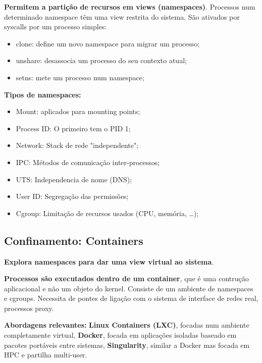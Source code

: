 \documentclass{article}
\begin{document}
\begin{flushleft}
  \textbf{Permitem a partição de recursos em views (namespaces)}.
  Processos num determinado namespace têm uma view restrita do sistema.
  São ativados por syscalls por um processo simples:
  \begin{itemize}
    \item clone: define um novo namespace para migrar um processo;
    \item unshare: desassocia um processo do seu contexto atual;
    \item setns: mete um processo num namespace;
  \end{itemize}

  \vspace{2mm}

  \textbf{Tipos de namespaces:}
  \begin{itemize}
    \item Mount: aplicados para mounting points;
    \item Process ID: O primeiro tem o PID 1;
    \item Network: Stack de rede "independente";
    \item IPC: Métodos de comunicação inter-processos;
    \item UTS: Independencia de nome (DNS);
    \item User ID: Segregação das permissões;
    \item Cgroup: Limitação de recursos usados (CPU, memória, \dots); 
  \end{itemize}
\end{flushleft}

\subsection{Confinamento: Containers}

\begin{flushleft}
  \textbf{Explora namespaces para dar uma view virtual ao sistema}.

  \vspace{2mm}

  \textbf{Processos são executados dentro de um container}, que é uma contrução
  aplicacional e não um objeto do kernel. Consiste de um ambiente
  de namespaces e cgroups. Necessita de pontes de ligação com o sistema de interface
  de redes real, processos proxy.

  \vspace{2mm}

  \textbf{Abordagens relevantes:} \textbf{Linux Containers (LXC)}, focadas num ambiente completamente
  virtual, \textbf{Docker}, focada em aplicações isoladas baseado em pacotes portáveis
  entre sistemas, \textbf{Singularity}, similar a Docker mas focada em HPC e partilha
  multi-user.
\end{flushleft}
\end{document}
